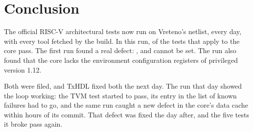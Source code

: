 \section{Conclusion}
\label{sec:conclusion}

The official RISC-V architectural tests now run on Vreteno's netlist,
every day, with every tool fetched by the build. In this run,
\NRtlPass{} of the \NTests{} tests that apply to the core pass. The
first run found a real defect: ,  and 
cannot be set. The run also found that the core lacks the environment
configuration registers of privileged version 1.12.

Both were filed, and TxHDL fixed both the next day. The run that day
showed the loop working: the TVM test started to pass, its entry in
the list of known failures had to go, and the same run caught a new
defect in the core's data cache within hours of its commit. That
defect was fixed the day after, and the five tests it broke pass
again.
